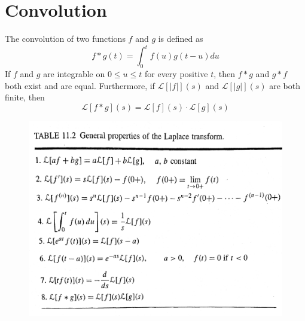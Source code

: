 \documentclass[11pt]{article}
\newcommand{\Lagr}{\mathcal{L}}
\begin{document}
\section{Convolution}
	The convolution of two functions $f$ and $g$ is defined as
	\begin{equation}
		f \ast g(t) = \int_0^t f(u)g(t-u)du
	\end{equation}
	If $f$ and $g$ are integrable on $0 \leq u \leq t$ for every positive $t$, then $f\ast g$ and $g \ast f$ both exist and are equal. Furthermore, if $\Lagr[|f|](s)$ and $\Lagr[|g|](s)$ are both finite, then 
	\begin{equation}
		\Lagr[f\ast g](s) = \Lagr[f](s) \cdot \Lagr[g](s)
	\end{equation}
	
	\begin{figure}[htb]
		\centering
		\includegraphics[width=\textwidth]{laplaceprop.jpg}
	\end{figure}

%		
%		


\end{document}
